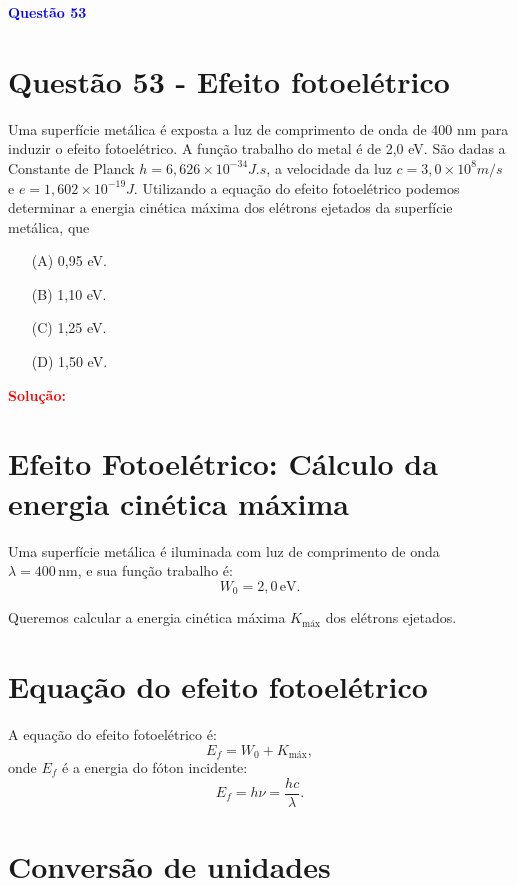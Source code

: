 \documentclass[a4paper,12pt]{article}
\begin{document}
\begin{flushleft}
\textbf{\textcolor{blue}{\Large Quest\~ao 53}}\\
\noindent
\section{Quest\~ao 53 - Efeito fotoelétrico}
Uma superfície metálica é exposta a luz de comprimento de onda de 400 nm para induzir o efeito fotoelétrico. A função
trabalho do metal é de 2,0 eV. São dadas a Constante de Planck $h = 6{,}626 \times 10^{-34} J.s$, a velocidade da luz 
$c = 3{,}0 \times 10^8 m/s$ e $e = 1{,}602 \times 10^{-19} J$. Utilizando a equação do efeito fotoelétrico podemos 
determinar a energia cinética máxima dos elétrons ejetados da superfície metálica, que

\begin{itemize}
\item[(A)] 0,95 eV.
\item[(B)] 1,10 eV.
\item[(C)] 1,25 eV.
\item[(D)] 1,50 eV.
\end{itemize}

\vspace{0.5cm}

\textcolor{red}{\textbf{Solução:}}\\

\section*{Efeito Fotoelétrico: Cálculo da energia cinética máxima}

Uma superfície metálica é iluminada com luz de comprimento de onda \( \lambda = 400\,\mathrm{nm} \), e sua função trabalho é:
\[
W_0 = 2{,}0\,\mathrm{eV}.
\]

Queremos calcular a energia cinética máxima \( K_{\text{máx}} \) dos elétrons ejetados.

\section*{Equação do efeito fotoelétrico}

A equação do efeito fotoelétrico é:
\[
E_f = W_0 + K_{\text{máx}},
\]
onde \(E_f\) é a energia do fóton incidente:
\[
E_f = h\nu = \frac{hc}{\lambda}.
\]

\section*{Conversão de unidades}


\end{flushleft}
\end{document}
